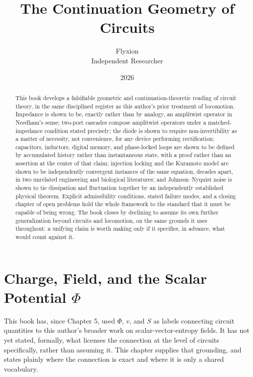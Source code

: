 \documentclass[12pt]{article}
\title{The Continuation Geometry of Circuits}
\author{Flyxion \\ Independent Researcher}
\date{2026}
\begin{document}
\maketitle

\begin{abstract}
\noindent This book develops a falsifiable geometric and continuation-theoretic reading of circuit theory, in the same disciplined register as this author's prior treatment of locomotion. Impedance is shown to be, exactly rather than by analogy, an amplitwist operator in Needham's sense; two-port cascades compose amplitwist operators under a matched-impedance condition stated precisely; the diode is shown to require non-invertibility as a matter of necessity, not convenience, for any device performing rectification; capacitors, inductors, digital memory, and phase-locked loops are shown to be defined by accumulated history rather than instantaneous state, with a proof rather than an assertion at the center of that claim; injection locking and the Kuramoto model are shown to be independently convergent instances of the same equation, decades apart, in two unrelated engineering and biological literatures; and Johnson--Nyquist noise is shown to tie dissipation and fluctuation together by an independently established physical theorem. Explicit admissibility conditions, stated failure modes, and a closing chapter of open problems hold the whole framework to the standard that it must be capable of being wrong. The book closes by declining to assume its own further generalization beyond circuits and locomotion, on the same grounds it uses throughout: a unifying claim is worth making only if it specifies, in advance, what would count against it.
\end{abstract}

\tableofcontents
\newpage

\section{Charge, Field, and the Scalar Potential $\Phi$}

This book has, since Chapter 5, used $\Phi$, $v$, and $S$ as labels connecting circuit quantities to this author's broader work on scalar-vector-entropy fields. It has not yet stated, formally, what licenses the connection at the level of circuits specifically, rather than assuming it. This chapter supplies that grounding, and states plainly where the connection is exact and where it is only a shared vocabulary.
\end{document}
